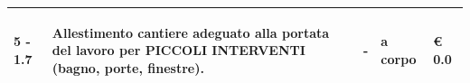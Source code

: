 \documentclass[a4paper]{article}
\begin{document}
\begin{tabular}{ | L{10mm} |  L{86mm} | L{12mm} | L{12mm} | L{16mm} | }
                            
                              \vspace{2.5mm}
                              \begin{spacing}{0}
                           5 - 1.7
                              \end{spacing} &
                              \vspace{2.5mm}
                              \begin{spacing}{0}
                           Allestimento cantiere adeguato alla portata del lavoro per PICCOLI INTERVENTI (bagno, porte, finestre). 
                              \end{spacing} &
                              \vspace{2.5mm}
                              \begin{spacing}{0}
                           -
                              \end{spacing} &
                              \vspace{2.5mm}
                              \begin{spacing}{0}
                           a corpo
                              \end{spacing} &
                              \vspace{2.5mm}
                              \begin{spacing}{0}
                                \euro\hfill 
                            0.0
                              \end{spacing} \\
                              \hline


\end{tabular}
\end{document}
